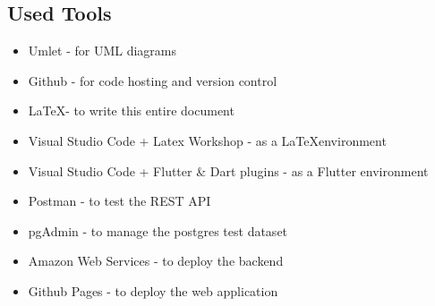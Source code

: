 \subsection{Used Tools}
\begin{itemize}
    \item Umlet - for UML diagrams
    \item Github - for code hosting and version control
    \item \LaTeX \space  - to write this entire document
    \item Visual Studio Code + Latex Workshop - as a \LaTeX \space environment
    \item Visual Studio Code + Flutter \& Dart plugins - as a Flutter environment
    \item Postman - to test the REST API
    \item pgAdmin - to manage the postgres test dataset
    \item Amazon Web Services - to deploy the backend
    \item Github Pages - to deploy the web application
\end{itemize}

\clearpage